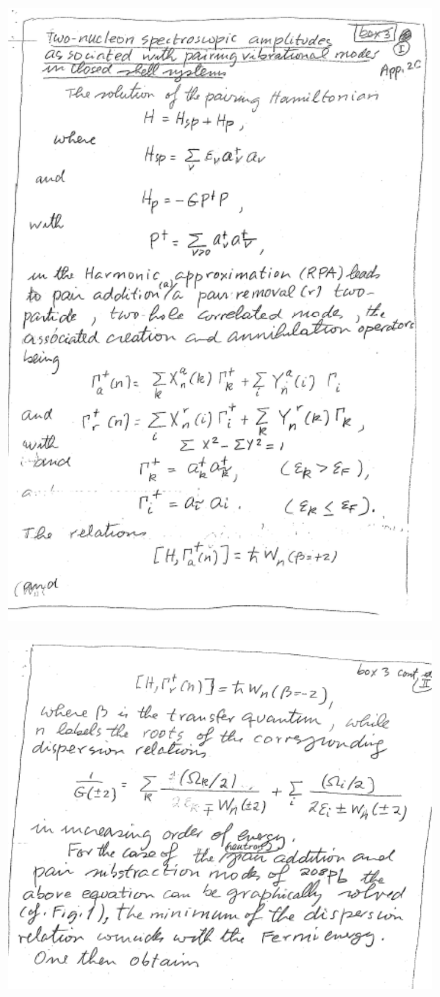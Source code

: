 \documentclass[a4paper,11pt]{book}
\numberwithin{equation}{section}
\numberwithin{figure}{section}
\numberwithin{table}{section}
\begin{document}
\begin{figure}
\centerline{\includegraphics*[width=\textwidth,angle=0]{figs/box3_1.pdf}}
\end{figure}
\begin{figure}
\centerline{\includegraphics*[width=\textwidth,angle=0]{figs/box3_2.pdf}}
\end{figure}
\end{document}
